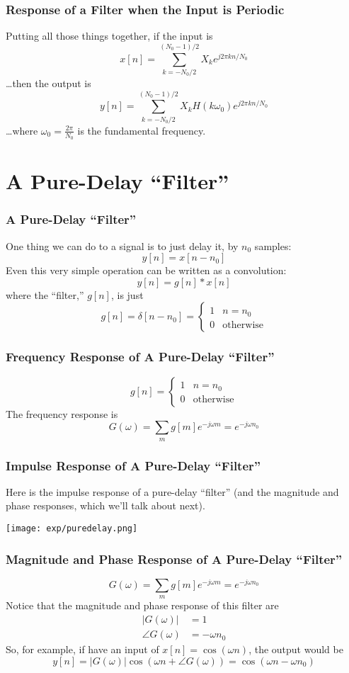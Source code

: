 \documentclass{beamer}
\begin{document}
\begin{frame}
  \frametitle{Response of a Filter when the Input is Periodic}

  Putting all those things together, if the input is
  \[
  x[n] =\sum_{k=-N_0/2}^{(N_0-1)/2} X_k e^{j2\pi kn/N_0}
  \]
  \ldots then the output is
  \[
  y[n] = \sum_{k=-N_0/2}^{(N_0-1)/2} X_k H(k\omega_0) e^{j2\pi kn/N_0}
  \]
  \ldots where $\omega_0=\frac{2\pi}{N_0}$ is the fundamental frequency.
\end{frame}


\section[Pure Delay]{A Pure-Delay ``Filter''}
\setcounter{subsection}{1}

\begin{frame}
  \frametitle{A Pure-Delay ``Filter''}

  One thing we can do to a signal is to just delay it, by $n_0$ samples:
  \[
  y[n] = x[n-n_0]
  \]
  Even this very simple operation can be written as a convolution:
  \[
  y[n]=g[n]\ast x[n]
  \]
  where the ``filter,'' $g[n]$, is just
  \[
  g[n]=\delta[n-n_0] = \begin{cases}
  1 & n=n_0\\
  0 & \mbox{otherwise}
  \end{cases}
  \]
\end{frame}

\begin{frame}
  \frametitle{Frequency Response of A Pure-Delay ``Filter''}

  \[
  g[n]=\begin{cases}
  1 & n=n_0\\
  0 & \mbox{otherwise}
  \end{cases}
  \]
  The frequency response is
  \[
  G(\omega)=\sum_m g[m]e^{-j\omega m} = e^{-j\omega n_0}
  \]
  
\end{frame}

\begin{frame}
  \frametitle{Impulse Response of A Pure-Delay ``Filter''}
  Here is the impulse response of a pure-delay ``filter'' (and the magnitude and
  phase responses, which we'll talk about next).
\centerline{\texttt{[image: exp/puredelay.png]}}
\end{frame}

\begin{frame}
  \frametitle{Magnitude and Phase Response of A Pure-Delay ``Filter''}

  \[
  G(\omega)=\sum_m g[m]e^{-j\omega m} = e^{-j\omega n_0}
  \]
  Notice that the magnitude and phase response of this filter are
  \begin{align*}
    |G(\omega)| &= 1\\
    \angle G(\omega) &= -\omega n_0
  \end{align*}
  So, for example, if have an input of $x[n]=\cos(\omega n)$, the
  output would be
  \[
  y[n]=|G(\omega)|\cos\left(\omega n+\angle G(\omega)\right)
  = \cos\left(\omega n-\omega n_0\right)
  \]
\end{frame}
\end{document}

